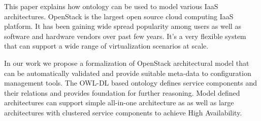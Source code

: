 
This paper explains how ontology can be used to model various IaaS architectures. OpenStack is the largest open source cloud computing IaaS platform. It has been gaining wide spread popularity among users as well as software and hardware vendors over past few years. It's a very flexible system that can support a wide range of virtualization scenarios at scale.

In our work we propose a formalization of OpenStack architectural model that can be automatically validated and provide suitable meta-data to configuration management tools. The OWL-DL based ontology defines service components and their relations and  provides foundation for further reasoning. Model defined architectures can support simple all-in-one architecture as as well as large architectures with clustered service components to achieve High Availability.
